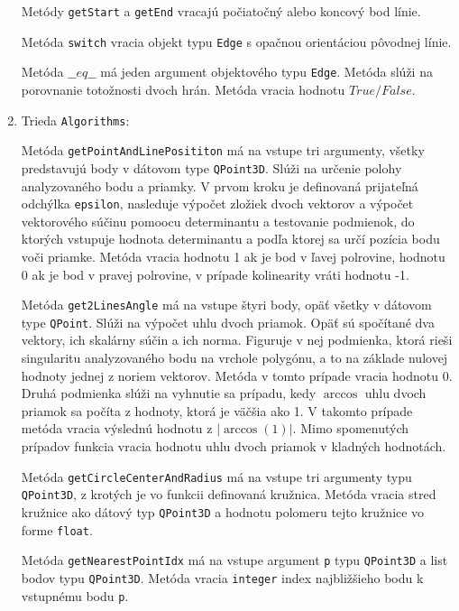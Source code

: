 \documentclass[11pt]{article}
\begin{document}
\begin{enumerate}
    Metódy \texttt{getStart} a \texttt{getEnd} vracajú počiatočný alebo koncový bod línie.
    
    Metóda \texttt{switch} vracia objekt typu \texttt{Edge} s opačnou orientáciou pôvodnej línie. 
    
    Metóda \texttt{$\_\_eq\_\_$} má jeden argument objektového typu \texttt{Edge}. Metóda slúži na porovnanie totožnosti dvoch hrán. Metóda vracia hodnotu \texttt{$True/False$}. 
    
    \item Trieda \texttt{Algorithms}:
    
    Metóda \texttt{getPointAndLinePosititon} má na vstupe tri argumenty, všetky predstavujú body v dátovom type \texttt{QPoint3D}. Slúži na určenie polohy analyzovaného bodu a priamky. \newline
    V prvom kroku je definovaná prijateľná odchýlka \texttt{epsilon}, nasleduje výpočet zložiek dvoch vektorov a výpočet vektorového súčinu pomoocu determinantu a testovanie podmienok, do ktorých vstupuje hodnota determinantu a podľa ktorej sa určí pozícia bodu voči priamke. \newline
    Metóda vracia hodnotu 1 ak je bod v ľavej polrovine, hodnotu 0 ak je bod v pravej polrovine, v prípade kolinearity vráti hodnotu -1.
    
    Metóda \texttt{get2LinesAngle} má na vstupe štyri body, opäť všetky v dátovom type \texttt{QPoint}. Slúži na výpočet uhlu dvoch priamok. Opäť sú spočítané dva vektory, ich skalárny súčin a ich norma. \newline
    Figuruje v nej podmienka, ktorá rieši singularitu analyzovaného bodu na vrchole polygónu, a to na základe nulovej hodnoty jednej z noriem vektorov. Metóda v tomto prípade vracia hodnotu 0.\newline
    Druhá podmienka slúži na vyhnutie sa prípadu, kedy $\arccos$ uhlu dvoch priamok sa počíta z hodnoty, ktorá je väčšia ako 1. V takomto prípade metóda vracia výslednú hodnotu z $|\arccos(1)|$.\newline
    Mimo spomenutých prípadov funkcia vracia hodnotu uhlu dvoch priamok v kladných hodnotách.
    
    Metóda \texttt{getCircleCenterAndRadius} má na vstupe tri argumenty typu \texttt{QPoint3D}, z krotých je vo funkcii definovaná kružnica. Metóda vracia stred kružnice ako dátový typ \texttt{QPoint3D} a hodnotu polomeru tejto kružnice vo forme \texttt{float}.
    
    Metóda \texttt{getNearestPointIdx} má na vstupe argument \texttt{p} typu \texttt{QPoint3D} a list bodov typu \texttt{QPoint3D}. Metóda vracia \texttt{integer} index najbližšieho bodu k vstupnému bodu \texttt{p}. 
    

\end{enumerate}
\end{document}

